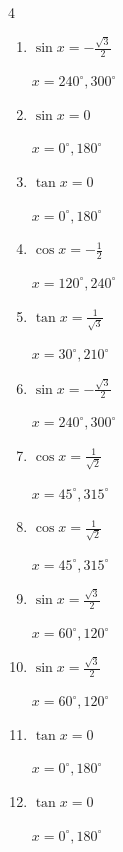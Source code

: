 \begin{multicols}{4}
\begin{enumerate}
  \item $\displaystyle \sin{x}  = -\frac{\sqrt{3}}{2}$

        $\displaystyle x = 240^{\circ} , 300^{\circ}$

  \item $\displaystyle \sin{x}  = 0$

        $\displaystyle x = 0^{\circ} , 180^{\circ}$

  \item $\displaystyle \tan{x}  = 0$

        $\displaystyle x = 0^{\circ} , 180^{\circ}$

  \item $\displaystyle \cos{x}  = -\frac{1}{2}$

        $\displaystyle x = 120^{\circ} , 240^{\circ}$

  \item $\displaystyle \tan{x}  = \frac{1}{\sqrt{3}}$

        $\displaystyle x = 30^{\circ} , 210^{\circ}$

  \item $\displaystyle \sin{x}  = -\frac{\sqrt{3}}{2}$

        $\displaystyle x = 240^{\circ} , 300^{\circ}$

  \item $\displaystyle \cos{x}  = \frac{1}{\sqrt{2}}$

        $\displaystyle x = 45^{\circ} , 315^{\circ}$

  \item $\displaystyle \cos{x}  = \frac{1}{\sqrt{2}}$

        $\displaystyle x = 45^{\circ} , 315^{\circ}$

  \item $\displaystyle \sin{x}  = \frac{\sqrt{3}}{2}$

        $\displaystyle x = 60^{\circ} , 120^{\circ}$

  \item $\displaystyle \sin{x}  = \frac{\sqrt{3}}{2}$

        $\displaystyle x = 60^{\circ} , 120^{\circ}$

  \item $\displaystyle \tan{x}  = 0$

        $\displaystyle x = 0^{\circ} , 180^{\circ}$

  \item $\displaystyle \tan{x}  = 0$

        $\displaystyle x = 0^{\circ} , 180^{\circ}$


\end{enumerate}
\end{multicols}
